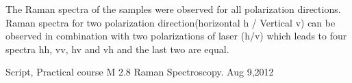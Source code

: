 \documentclass[openany,11pt,a4paper]{report}
\begin{document}
The Raman spectra of the samples were observed for all polarization directions. Raman spectra for two polarization direction(horizontal h / Vertical v) can be observed in combination with two polarizations of laser (h/v) which leads to four spectra hh, vv, hv and vh and the last two are equal. \cite{bib1}






\begin{thebibliography}{99}



Script, Practical course M 2.8 Raman Spectroscopy. Aug 9,2012






 

\bibitem{} 

\bibitem{} 



\bibitem{} 


\end{thebibliography}
\end{document}
